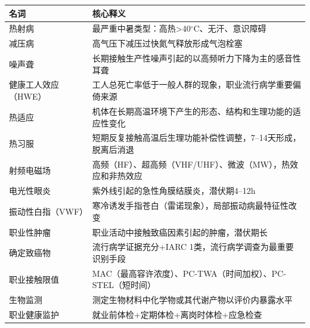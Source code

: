 \begin{table}[htbp]
\centering
\begin{tabularx}{\textwidth}{lX}
\hline
\textbf{名词} & \textbf{核心释义} \\
\hline
热射病 & 最严重中暑类型：高热>40$^\circ$C、无汗、意识障碍 \\
减压病 & 高气压下减压过快氮气释放形成气泡栓塞 \\
噪声聋 & 长期接触生产性噪声引起的以高频听力下降为主的感音性耳聋 \\
健康工人效应（HWE） & 工人总死亡率低于一般人群的现象，职业流行病学重要偏倚来源 \\
热适应 & 机体在长期高温环境下产生的形态、结构和生理功能的适应性变化 \\
热习服 & 短期反复接触高温后生理功能补偿性调整，7--14天形成，脱离后消退 \\
射频电磁场 & 高频（HF）、超高频（VHF/UHF）、微波（MW），热效应和非热效应 \\
电光性眼炎 & 紫外线引起的急性角膜结膜炎，潜伏期4--12h \\
振动性白指（VWF） & 寒冷诱发手指苍白（雷诺现象），局部振动病最特征性改变 \\
职业性肿瘤 & 职业活动中接触致癌因素引起的肿瘤，潜伏期长 \\
确定致癌物 & 流行病学证据充分+IARC 1类，流行病学调查为最重要识别手段 \\
职业接触限值 & MAC（最高容许浓度）、PC-TWA（时间加权）、PC-STEL（短时间）\\
生物监测 & 测定生物材料中化学物或其代谢产物以评价内暴露水平 \\
职业健康监护 & 就业前体检+定期体检+离岗时体检+应急检查 \\
\hline
\end{tabularx}
\end{table}

\newpage

\vspace*{3cm}


\newpage